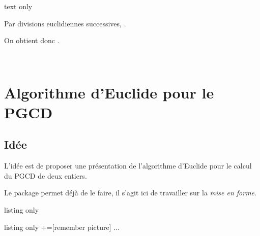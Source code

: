 \documentclass[a4paper,french,11pt]{article}
\newcommand\ctex[1]{\tcbox[vignettelatex]{#1}}
\begin{document}
\begin{PresCodeSortiePL}{text only}

\medskip

Par divisions euclidiennes successives, .

\medskip


\medskip

On obtient donc .

\vspace{1.5cm}

~
\end{PresCodeSortiePL}

\newpage

\section{Algorithme d'Euclide pour le PGCD}\label{prespgcd}

\subsection{Idée}

\begin{tipblock}
L'idée est de proposer une \og présentation \fg{} de l'algorithme d'Euclide pour le calcul du PGCD de deux entiers.

Le package \ctex{xintgcd} permet déjà de le faire, il s'agit ici de travailler sur la \textit{mise en forme}.
\end{tipblock}

\begin{PresCodeTexPL}{listing only}
\end{PresCodeTexPL}

\begin{PresCodeTexPL}{listing only}
+=[remember picture]
...
\end{PresCodeTexPL}

\begin{PresCodePL}{}
\end{PresCodePL}
\end{document}
